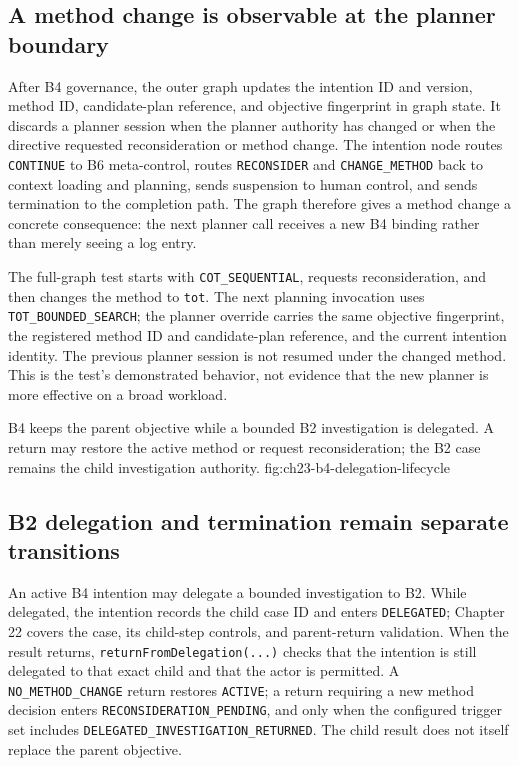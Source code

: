\subsection{A method change is observable at the planner boundary}
\label{subsec:ch23-next-planner-call}

After B4 governance, the outer graph updates the intention ID and version, method ID, candidate-plan reference, and objective fingerprint in graph state. It discards a planner session when the planner authority has changed or when the directive requested reconsideration or method change. The intention node routes \texttt{CONTINUE} to B6 meta-control, routes \texttt{RECONSIDER} and \texttt{CHANGE\_METHOD} back to context loading and planning, sends suspension to human control, and sends termination to the completion path. The graph therefore gives a method change a concrete consequence: the next planner call receives a new B4 binding rather than merely seeing a log entry.

The full-graph test starts with \texttt{COT\_SEQUENTIAL}, requests reconsideration, and then changes the method to \texttt{tot}. The next planning invocation uses \texttt{TOT\_BOUNDED\_SEARCH}; the planner override carries the same objective fingerprint, the registered method ID and candidate-plan reference, and the current intention identity. The previous planner session is not resumed under the changed method. This is the test's demonstrated behavior, not evidence that the new planner is more effective on a broad workload.

  {B4 keeps the parent objective while a bounded B2 investigation is delegated. A return may restore the active method or request reconsideration; the B2 case remains the child investigation authority.}
  {fig:ch23-b4-delegation-lifecycle}

\subsection{B2 delegation and termination remain separate transitions}
\label{subsec:ch23-b4-b2-handoff}

An active B4 intention may delegate a bounded investigation to B2. While delegated, the intention records the child case ID and enters \texttt{DELEGATED}; Chapter 22 covers the case, its child-step controls, and parent-return validation. When the result returns, \texttt{returnFromDelegation(...)} checks that the intention is still delegated to that exact child and that the actor is permitted. A \texttt{NO\_METHOD\_CHANGE} return restores \texttt{ACTIVE}; a return requiring a new method decision enters \texttt{RECONSIDERATION\_PENDING}, and only when the configured trigger set includes \texttt{DELEGATED\_INVESTIGATION\_RETURNED}. The child result does not itself replace the parent objective.

